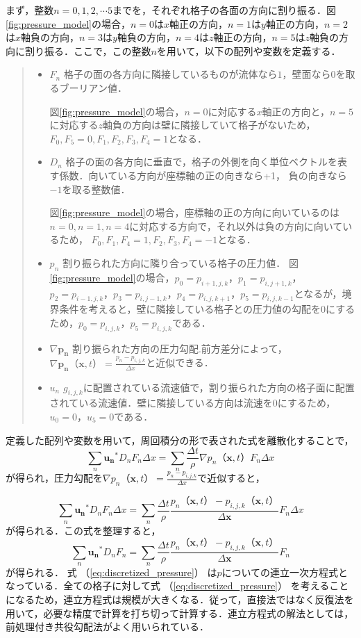 \documentclass[a4j,12pt]{jreport}
\begin{document}
まず，整数$n=0,1,2,\cdots 5$までを，それぞれ格子の各面の方向に割り振る．図\ref{fig:pressure_model}の場合，$n=0$は$x$軸正の方向，$n=1$は$y$軸正の方向，$n=2$は$x$軸負の方向，$n=3$は$y$軸負の方向，$n=4$は$z$軸正の方向，$n=5$は$z$軸負の方向に割り振る．ここで，この整数$n$を用いて，以下の配列や変数を定義する．
\begin{quote}
	\begin{itemize}
		\item $F_n$ 格子の面の各方向に隣接しているものが流体なら$1$，壁面なら$0$を取るブーリアン値．
		
		図\ref{fig:pressure_model}の場合，$n=0$に対応する$x$軸正の方向と，$n=5$に対応する$z$軸負の方向は壁に隣接していて格子がないため，$F_0,F_5 = 0,F_1,F_2,F_3,F_4 = 1$となる．
		\item $D_n$ 格子の面の各方向に垂直で，格子の外側を向く単位ベクトルを表す係数．向いている方向が座標軸の正の向きなら+1，					負の向きなら$-1$を取る整数値．
		
		図\ref{fig:pressure_model}の場合，座標軸の正の方向に向いているのは$n=0,n=1,n=4$に対応する方向で，それ以外は負の方向に向いているため，
		$F_0,F_1,F_4 = 1,F_2,F_3,F_4 = -1$となる．
		\item $p_n$ 割り振られた方向に隣り合っている格子の圧力値．
		図\ref{fig:pressure_model}の場合，$p_0 = p_{i+1,j,k}$，$p_1 = p_{i,j+1,k}$，$p_2 = p_{i-1,j,k}$，$p_3 = p_{i,j-1,k}$，$p_4 = p_{i,j,k+1}$，$p_5 = p_{i,j,k-1}$となるが，境界条件を考えると，壁に隣接している格子との圧力値の勾配を$0$にするため，$p_0 = p_{i,j,k}$，$p_5 = p_{i,j,k}$である．
		\item $\nabla\bm{p_n}$ 割り振られた方向の圧力勾配.前方差分によって，$\nabla \bm{p_n} （\bm{x},t）  = \frac{p_n - p_{i,j,k}}{\varDelta x}$と近似できる．
		\item $u_n$ $g_{i,j,k}$に配置されている流速値で，割り振られた方向の格子面に配置されている流速値．壁に隣接している方向は流速を$0$にするため，$u_0 = 0$，$u_5 = 0$である．
	\end{itemize}
\end{quote}

定義した配列や変数を用いて，周回積分の形で表された式を離散化することで，
$$ \sum_{n}\bm{u_n}^*D_nF_n\varDelta x = \sum_{n}\frac{\varDelta t}{\rho}\nabla p_n （\bm{x},t） F_n\varDelta x $$
が得られ，圧力勾配を$\nabla p_n （\bm{x},t）  = \frac{p_n - p_{i,j,k}}{\varDelta x}$で近似すると，

$$ \sum_{n}\bm{u_n}^*D_nF_n\varDelta x = \sum_{n}\frac{\varDelta t}{\rho}\frac{p_n （\bm{x},t） - p_{i,j,k} （\bm{x},t） }{\varDelta \bm{x}}F_n\varDelta x $$
が得られる．この式を整理すると，
\begin{equation}\label{eq:discretized_pressure}
\sum_{n}\bm{u_n}^*D_nF_n= \sum_{n}\frac{\varDelta t}{\rho}\frac{p_n （\bm{x},t）  - p_{i,j,k} （\bm{x},t） }{\varDelta \bm{x}}F_n
\end{equation} 
が得られる．
式 （\ref{eq:discretized_pressure}） は$p$についての連立一次方程式となっている．全ての格子に対して式 （\ref{eq:discretized_pressure}） を考えることになるため，連立方程式は規模が大きくなる．従って，直接法ではなく反復法を用いて，必要な精度で計算を打ち切って計算する．連立方程式の解法としては，前処理付き共役勾配法がよく用いられている．
\end{document}
